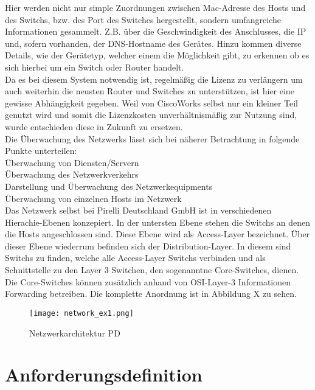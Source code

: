 Hier werden nicht nur simple Zuordnungen zwischen Mac-Adresse des Hosts und des Switchs, bzw. des Port des Switches hergestellt,
sondern umfangreiche Informationen gesammelt. Z.B. über die Geschwindigkeit des Anschlusses, die IP und, sofern vorhanden, der DNS-Hostname des Gerätes.
Hinzu kommen diverse Details, wie der Gerätetyp, welcher einem die Möglichkeit gibt, zu erkennen ob es sich hierbei um ein Switch oder Router handelt.\\
Da es bei diesem System notwendig ist, regelmäßig die Lizenz zu verlängern um auch weiterhin die neusten Router und Switches zu unterstützen, ist hier eine gewisse Abhängigkeit gegeben.
Weil von CiscoWorks selbst nur ein kleiner Teil genutzt wird und somit die Lizenzkosten unverhältnismäßig zur Nutzung sind, wurde entschieden diese in Zukunft zu ersetzen.\\

Die Überwachung des Netzwerks lässt sich bei näherer Betrachtung in folgende Punkte unterteilen:\\
Überwachung von Diensten/Servern\\
Überwachung des Netzwerkverkehrs\\
Darstellung und Überwachung des Netzwerkequipments\\
Überwachung von einzelnen Hosts im Netzwerk\\

Das Netzwerk selbst bei Pirelli Deutschland GmbH ist in verschiedenen Hierachie-Ebenen konzepiert.
In der untersten Ebene stehen die Switchs an denen die Hosts angeschlossen sind. Diese Ebene wird als Access-Layer bezeichnet.
Über dieser Ebene wiederrum befinden sich der Distribution-Layer. In diesem sind Switchs zu finden, welche alle Access-Layer Switchs verbinden und als Schnittstelle zu den Layer 3 Switchen, den sogenanntne Core-Switches, dienen.
Die Core-Switches können zusätzlich anhand von OSI-Layer-3 Informationen Forwarding betreiben.
Die komplette Anordnung ist in Abbildung X zu sehen.


\begin{figure}[H]
\centering
\texttt{[image: network\_ex1.png]}
\caption{Netzwerkarchitektur PD}
\label{fig:show_s1_s2_p1_n1}
\end{figure}

\section{Anforderungsdefinition}
\label{sec:anfdef}

